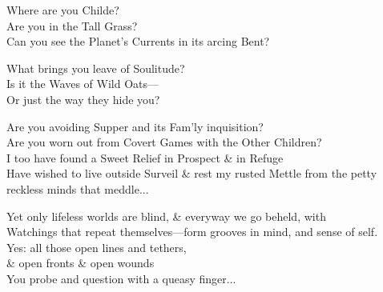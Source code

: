 

Where are you Childe? \\
Are you in the Tall Grass? \\
Can you see the Planet's Currents in its arcing Bent? 

What brings you leave of Soulitude? \\
Is it the Waves of Wild Oats— \\
Or just the way they hide you? 

Are you avoiding Supper and its Fam'ly inquisition? \\
Are you worn out from Covert Games with the Other Children? \\

I too have found a Sweet Relief in Prospect \& in Refuge \\
Have wished to live outside Surveil \& rest my rusted Mettle from the petty reckless minds that meddle...

Yet only lifeless worlds are blind, \& everyway we go beheld, with \\
Watchings that repeat themselves—form grooves in mind, and sense of self. \\
Yes: all those open lines and tethers, \\
\qquad \& open fronts \& open wounds \\
\qquad You probe and question with a queasy finger...